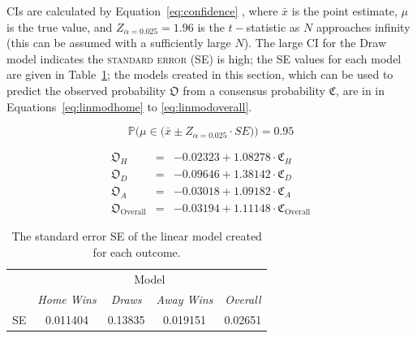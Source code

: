 \documentclass[a4paper,10pt]{report}
\begin{document}
CIs are calculated by Equation~\ref{eq:confidence} \autocite{Mendenhall13}, where $\bar{x}$ is the point estimate, $\mu$ is the true value, and $Z_{\alpha=0.025} = 1.96$ is the $t-$statistic as $N$ approaches infinity (this can be assumed with a sufficiently large $N$). The large CI for the Draw model indicates the \textsc{standard error} (SE) is high; the SE values for each model are given in Table~\ref{tab:elitestandarderrors}; the models created in this section, which can be used to predict the observed probability $\mathfrak{O}$ from a consensus probability $\mathfrak{C}$, are in in Equations~\ref{eq:linmodhome} to \ref{eq:linmodoverall}. 

\begin{equation}\label{eq:confidence}
\mathbb{P}\bigg( \mu \in\big( \bar{x} \pm Z_{\alpha=0.025}\cdot SE\big) \bigg) = 0.95 
\end{equation}

\begin{eqnarray}
\label{eq:linmodhome} \mathfrak{O}_{H} & = & -0.02323 + 1.08278\cdot\mathfrak{C}_{H}\\
\label{eq:linmoddraw} \mathfrak{O}_{D} & = & -0.09646 + 1.38142\cdot\mathfrak{C}_{D}\\
\label{eq:linmodaway} \mathfrak{O}_{A} & = & -0.03018 + 1.09182\cdot\mathfrak{C}_{A}\\
\label{eq:linmodoverall} \mathfrak{O}_{\textrm{Overall}} & = & -0.03194 + 1.11148\cdot\mathfrak{C}_{\textrm{Overall}}
\end{eqnarray}

\begin{table}[h!]\begin{center}\begin{tabular}[h!]{c||ccc|c}
&\multicolumn{4}{c}{Model}\\
& \textit{Home Wins} & \textit{Draws} & \textit{Away Wins} & \textit{Overall} \\\hline\hline
SE & 0.011404 & 0.13835 & 0.019151 & 0.02651
\end{tabular}\end{center}\caption{The standard error SE of the linear model created for each outcome.}\label{tab:elitestandarderrors}\end{table}
\end{document}
